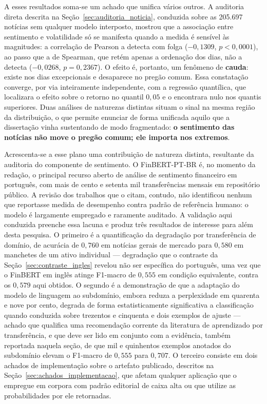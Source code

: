 A esses resultados soma-se um achado que unifica vários outros. A auditoria direta descrita na Seção~\ref{sec:auditoria_noticia}, conduzida sobre as 205.697 notícias sem qualquer modelo interposto, mostrou que a associação entre sentimento e volatilidade só se manifesta quando a medida é sensível às magnitudes: a correlação de Pearson a detecta com folga ($-0{,}1309$, $p < 0{,}0001$), ao passo que a de Spearman, que retém apenas a ordenação dos dias, não a detecta ($-0{,}0268$, $p = 0{,}2367$). O efeito é, portanto, um fenômeno de \textbf{cauda}: existe nos dias excepcionais e desaparece no pregão comum. Essa constatação converge, por via inteiramente independente, com a regressão quantílica, que localizara o efeito sobre o retorno no quantil $0{,}05$ e o encontrara nulo nos quantis superiores. Duas análises de naturezas distintas situam o sinal na mesma região da distribuição, o que permite enunciar de forma unificada aquilo que a dissertação vinha sustentando de modo fragmentado: \textbf{o sentimento das notícias não move o pregão comum; ele importa nos extremos}.

Acrescenta-se a esse plano uma contribuição de natureza distinta, resultante da auditoria do componente de sentimento. O FinBERT-PT-BR é, no momento da redação, o principal recurso aberto de análise de sentimento financeiro em português, com mais de cento e setenta mil transferências mensais em repositório público. A revisão dos trabalhos que o citam, contudo, não identificou nenhum que reportasse medida de desempenho contra padrão de referência humano: o modelo é largamente empregado e raramente auditado. A validação aqui conduzida preenche essa lacuna e produz três resultados de interesse para além desta pesquisa. O primeiro é a quantificação da degradação por transferência de domínio, de acurácia de $0{,}760$ em notícias gerais de mercado para $0{,}580$ em manchetes de um ativo individual --- degradação que o contraste da Seção~\ref{sec:contraste_ingles} revelou não ser específica do português, uma vez que o FinBERT em inglês atinge F1-macro de $0{,}555$ em condição equivalente, contra os $0{,}579$ aqui obtidos. O segundo é a demonstração de que a adaptação do modelo de linguagem ao subdomínio, embora reduza a perplexidade em quarenta e nove por cento, degrada de forma estatisticamente significativa a classificação quando conduzida sobre trezentos e cinquenta e dois exemplos de ajuste --- achado que qualifica uma recomendação corrente da literatura de aprendizado por transferência, e que deve ser lido em conjunto com a evidência, também reportada naquela seção, de que mil e quinhentos exemplos anotados do subdomínio elevam o F1-macro de $0{,}555$ para $0{,}707$. O terceiro consiste em dois achados de implementação sobre o artefato publicado, descritos na Seção~\ref{sec:achados_implementacao}, que afetam qualquer aplicação que o empregue em corpora com padrão editorial de caixa alta ou que utilize as probabilidades por ele retornadas.

